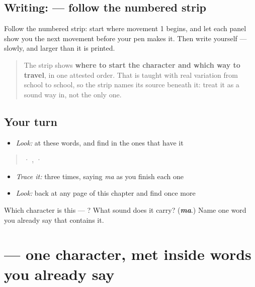\subsection*{Writing:  — follow the numbered strip}

Follow the numbered strip: start where movement 1 begins, and let each panel show you the next movement before your pen makes it. Then write  yourself — slowly, and larger than it is printed.

\begin{quote}
The strip shows \textbf{where to start the character and which way to travel}, in one attested order. That is taught with real variation from school to school, so the strip names its source beneath it: treat it as a sound way in, not the only one.
\end{quote}

\subsection*{Your turn}
\begin{itemize}
\raggedright
  \item \emph{Look:} at these words, and find  in the ones that have it
\end{itemize}

\begin{quote}
  ·  ,   ·  
\end{quote}

\begin{itemize}
\raggedright
  \item \emph{Trace it:}  three times, saying \emph{ma} as you finish each one
  \item \emph{Look:} back at any page of this chapter and find  once more
\end{itemize}

\begin{tcolorbox}[breakable,colback=teal!4,colframe=teal!35!black,title={Before you move on}]
Which character is this — ? What sound does it carry? (\emph{\textbf{ma}}.) Name one word you already say that contains it.
\end{tcolorbox}
\section[\texorpdfstring{\hi{र} (ra)}{र (ra)}]{ — one character, met inside words you already say}

